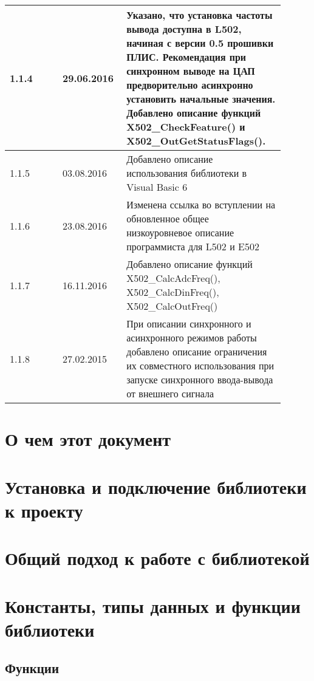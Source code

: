 \documentclass[12pt,a4paper,titlepage]{report}
\begin{document}
\begin{longtable}{|m{0.18\linewidth}|m{0.18\linewidth}|m{0.54\linewidth}|}
  1.1.4            & 29.06.2016    & Указано, что установка частоты вывода доступна в L502, начиная с версии 0.5 прошивки ПЛИС. Рекомендация при синхронном выводе на ЦАП предворительно асинхронно установить начальные значения. Добавлено описание функций X502\_CheckFeature() и X502\_OutGetStatusFlags(). \\\hline
  1.1.5            & 03.08.2016    & Добавлено описание использования библиотеки в Visual Basic 6 \\\hline
  1.1.6            & 23.08.2016    & Изменена ссылка во вступлении на обновленное общее низкоуровневое описание программиста для L502 и E502 \\\hline
  1.1.7            & 16.11.2016    & Добавлено описание функций X502\_CalcAdcFreq(), X502\_CalcDinFreq(), X502\_CalcOutFreq() \\\hline
  1.1.8            & 27.02.2015    & При описании синхронного и асинхронного режимов работы добавлено описание ограничения их совместного использования при запуске синхронного ввода-вывода от внешнего сигнала \\\hline
  \end{longtable}
  \newpage  
  
  \tableofcontents
  

\chapter{О чем этот документ}

\chapter{Установка и подключение библиотеки к проекту}

\chapter{Общий подход к работе с библиотекой}


  
\chapter{Константы, типы данных и функции библиотеки}



%
%
%
\section{Функции}











\end{document}
